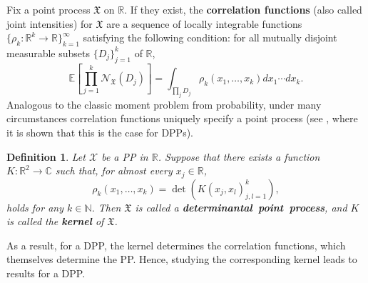 \documentclass[11pt]{article}
\newtheorem{definition}[theorem]{Definition}
\numberwithin{equation}{section}%
\numberwithin{theorem}{section}
\begin{document}
Fix a point process $\mathfrak{X}$ on $\mathbb{R}$. If they exist, the \textbf{correlation functions} (also called joint intensities) for $\mathfrak{X}$ are a sequence of locally integrable functions $\{\rho_k:\mathbb{R}^k\rightarrow\mathbb{R} \}_{k=1}^{\infty}$ satisfying the following condition: for all mutually disjoint measurable subsets $\{D_j\}_{j=1}^k$ of $\mathbb{R}$, 
\begin{equation*}
	\mathbb{E} \left[\prod_{j=1}^{k} \mathcal{N}_{\mathfrak{X}}(D_j)\right] = \int_{\prod_j D_j} \rho_k(x_1,\dots,x_k) dx_1 \cdots dx_k.
\end{equation*}   
Analogous to the classic moment problem from probability, under many circumstances correlation functions uniquely specify a point process (see \cite{soshnikov2000determinantal}, where it is shown that this is the case for DPPs).
\begin{definition}
  Let $\mathcal{X}$ be a PP in $\mathbb{R}$. Suppose that there exists a function $K:\mathbb{R}^2\rightarrow\mathbb{C}$ such that, for almost every $x_j\in\mathbb{R}$,
\begin{equation*}
    \rho_k(x_1,\dots,x_k)=\det\left(K(x_j,x_l)_{j,l=1}^k\right),
\end{equation*}
holds for any $k\in\mathbb{N}$. Then $\mathfrak{X}$ is called a \textbf{determinantal~point~process}, and $K$ is called the \textbf{kernel} of $\mathfrak{X}$.  
\end{definition}
As a result, for a DPP, the kernel determines the correlation functions, which themselves determine the PP. Hence, studying the corresponding kernel leads to results for a DPP.
\end{document}

